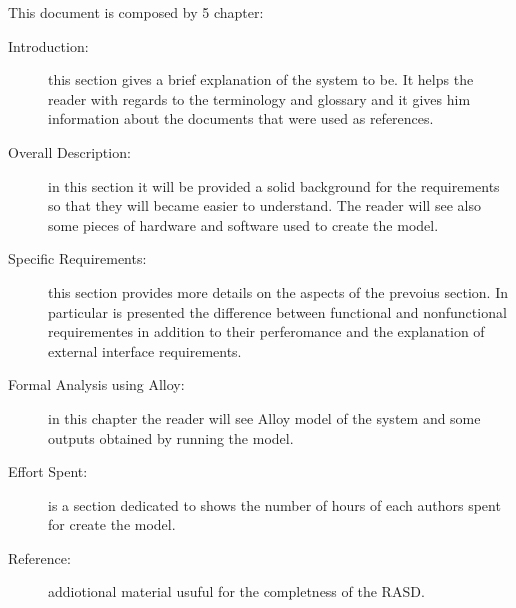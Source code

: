 This document is composed by 5 chapter:
\begin{description}
	\item[Introduction:] this section gives a brief explanation of the system to be. It helps the reader with regards to the terminology and glossary and it gives him information about the documents that were used as references. 
	
	\item[Overall Description:] in this section it will be provided a solid background for the requirements so that they will became easier to understand. The reader will see also some pieces of hardware and software used to create the model.
	
	\item[Specific Requirements:] this section provides more details on the aspects of the prevoius section. In particular is presented the difference between functional and nonfunctional requirementes in addition to their perferomance and the explanation of external interface requirements.
	
	\item[Formal Analysis  using Alloy:] in this chapter the reader will see Alloy model of the system and some outputs obtained by running the model.
	
	\item[Effort Spent:]  is a section dedicated to shows the number of hours of each authors spent for create the model. 
	
	\item[Reference:] addiotional material usuful for the completness of the RASD.
\end{description}
